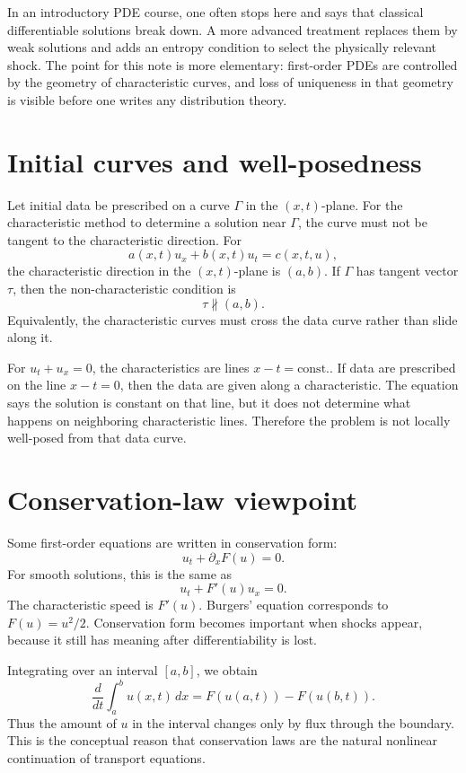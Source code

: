 In an introductory PDE course, one often stops here and says that classical differentiable solutions break down.  A more advanced treatment replaces them by weak solutions and adds an entropy condition to select the physically relevant shock.  The point for this note is more elementary: first-order PDEs are controlled by the geometry of characteristic curves, and loss of uniqueness in that geometry is visible before one writes any distribution theory.

\section{Initial curves and well-posedness}

Let initial data be prescribed on a curve \(\Gamma\) in the \((x,t)\)-plane.  For the characteristic method to determine a solution near \(\Gamma\), the curve must not be tangent to the characteristic direction.  For
\[
  a(x,t)u_x+b(x,t)u_t=c(x,t,u),
\]
the characteristic direction in the \((x,t)\)-plane is \((a,b)\).  If \(\Gamma\) has tangent vector \(\tau\), then the non-characteristic condition is
\[
  \tau \not\parallel (a,b).
\]
Equivalently, the characteristic curves must cross the data curve rather than slide along it.

\begin{example}
For \(u_t+u_x=0\), the characteristics are lines \(x-t=\text{const.}\).  If data are prescribed on the line \(x-t=0\), then the data are given along a characteristic.  The equation says the solution is constant on that line, but it does not determine what happens on neighboring characteristic lines.  Therefore the problem is not locally well-posed from that data curve.
\end{example}

\section{Conservation-law viewpoint}

Some first-order equations are written in conservation form:
\[
  u_t+\partial_x F(u)=0.
\]
For smooth solutions, this is the same as
\[
  u_t+F'(u)u_x=0.
\]
The characteristic speed is \(F'(u)\).  Burgers' equation corresponds to \(F(u)=u^2/2\).  Conservation form becomes important when shocks appear, because it still has meaning after differentiability is lost.

Integrating over an interval \([a,b]\), we obtain
\[
  \frac{d}{dt}\int_a^b u(x,t)\,dx=F(u(a,t))-F(u(b,t)).
\]
Thus the amount of \(u\) in the interval changes only by flux through the boundary.  This is the conceptual reason that conservation laws are the natural nonlinear continuation of transport equations.
